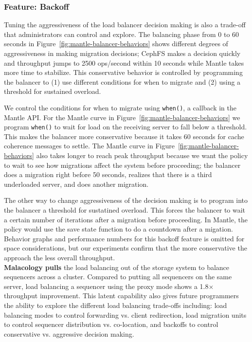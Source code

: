\documentclass[preprint]{sigplanconf-eurosys}
\begin{document}
\subsubsection{Feature: Backoff}
\label{sec:feature-backoff}

Tuning the aggressiveness of the load balancer decision making is also a
trade-off that administrators can control and explore. The balancing phase from
0 to 60 seconds in Figure~\ref{fig:mantle-balancer-behaviors} shows different
degrees of aggressiveness in making migration decisions; CephFS makes a
decision quickly and throughput jumps to 2500 ops/second within 10 seconds
while Mantle takes more time to stabilize. This conservative behavior is
controlled by programming the balancer to (1) use different conditions for when
to migrate and (2) using a threshold for sustained overload. 

We control the conditions for when to migrate using \texttt{when()}, a callback
in the Mantle API.  For the Mantle curve in
Figure~\ref{fig:mantle-balancer-behaviors} we program \texttt{when()} to wait
for load on the receiving server to fall below a threshold. This makes the
balancer more conservative because it takes 60 seconds for cache coherence
messages to settle.  The Mantle curve in
Figure~\ref{fig:mantle-balancer-behaviors} also takes longer to reach peak
throughput because we want the policy to wait to see how migrations affect the
system before proceeding; the balancer does a migration right before 50
seconds, realizes that there is a third underloaded server, and does another
migration. 

The other way to change aggressiveness of the decision making is to program
into the balancer a threshold for sustatined overload. This forces the balancer
to wait a certain number of iterations after a migration before proceeding. In
Mantle, the policy would use the save state function to do a countdown after a
migation.  Behavior graphs and performance numbers for this backoff feature is
omitted for space considerations, but our experiments confirm that the more
conservative the approach the less overall throughput.\\
 
\noindent\textbf{Malacology pulls} the load balancing out of the storage system
to balance sequencers across a cluster. Compared to putting all sequencers on
the same server, load balancing a sequencer using the proxy mode shows a
1.8\(\times\) throughput improvement. This latent capability also gives future
programmers the ability to explore the different load balancing trade-offs
including: load balancing modes to control forwarding vs. client redirection,
load migration units to control sequencer distribution vs. co-location, and
backoffs to control conservative vs. aggressive decision making.
\end{document}
